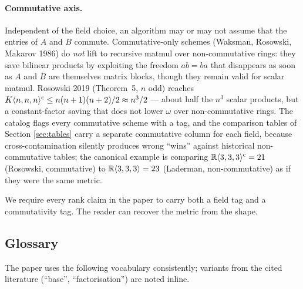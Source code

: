 \paragraph{Commutative axis.} Independent of the field choice, an
algorithm may or may not assume that the entries of \(A\) and \(B\)
commute. Commutative-only schemes (Waksman, Rosowski, Makarov 1986)
do \emph{not} lift to recursive matmul over non-commutative rings:
they save bilinear products by exploiting the freedom \(ab = ba\)
that disappears as soon as \(A\) and \(B\) are themselves matrix
blocks, though they remain valid for scalar matmul. Rosowski 2019
(Theorem~5, \(n\) odd) reaches
\(K\langle n, n, n \rangle^{\mathrm{c}} \le n(n+1)(n+2)/2 \approx n^3/2\) --- about
half the \(n^3\) scalar products, but a constant-factor saving that
does not lower \(\omega\) over non-commutative rings. The catalog
flags every commutative scheme with a  tag,
and the comparison tables of Section \ref{sec:tables} carry a
separate commutative column for each field, because
cross-contamination silently produces wrong ``wins'' against
historical non-commutative tables; the canonical example is comparing
\(\mathbb{R}\langle 3, 3, 3 \rangle^{\mathrm{c}} = 21\) (Rosowski, commutative) to
\(\mathbb{R}\langle 3, 3, 3 \rangle = 23\) (Laderman, non-commutative)
as if they were the same metric.

We require every rank claim in the paper to carry both a field tag
and a commutativity tag. The reader can recover the metric from the
shape.

\subsection{Glossary}

The paper uses the following vocabulary consistently; variants from
the cited literature (``base'', ``factorisation'') are noted inline.


